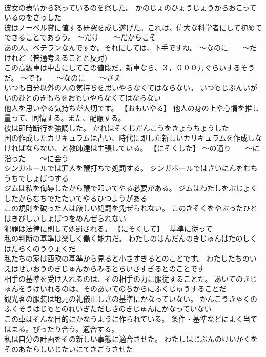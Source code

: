 \documentclass[8pt]{extreport}
\begin{document}
\begin{CJK}{UTF8}{min}
\\	彼女の表情から怒っているのを察した。	かのじょのひょうじょうからおこっているのをさっした 
\\	彼はノーベル賞に値する研究を成し遂げた。これは、偉大な科学者にして初めてできることであろう。	～だけ　　～だからこそ
\\	あの人、ベテランなんですか。それにしては、下手ですね。	～なのに　　～だけれど（普通考えることと反対）
\\	この高級車は中古にしてこの値段だ。新車なら、３，０００万ぐらいするそうだ。	～でも　　～なのに　　～さえ
\\	いつも自分以外の人の気持ちを思いやらなくてはならない。	いつもじぶんいがいのひとのきもちをおもいやらなくてはならない 
\\	他人を思いやる気持ちが大切です。	【おもいやる】 他人の身の上や心情を推し量って、同情する。また、配慮する。
\\	彼は即時断行を強調した。	かれはそくじだんこうをきょうちょうした 
\\	国の作成したカリキュラムは古い、時代に即した新しいカリキュラムを作成しなければならない、と教師達は主張している。	【にそくした】 ～の通り　　～に沿った　　～に会う
\\	シンガポールでは罪人を鞭打ちで処罰する。	シンガポールではざいにんをむちうちでしょばつする 
\\	ジムは私を侮辱したから鞭で叩いてやる必要がある。	ジムはわたしをぶじょくしたからむちでたたいてやるひつようがある 
\\	この規則を破った人は厳しい処罰を免ぜられない。	このきそくをやぶったひとはきびしいしょばつをめんぜられない 
\\	犯罪は法律に則して処罰される。	【にそくして】　 基準に従って
\\	私の判断の基準は楽しく働く能力だ。	わたしのはんだんのきじゅんはたのしくはたらくのうりょくだ 
\\	私たちの家は西欧の基準から見ると小さすぎるとのことです。	わたしたちのいえはせいおうのきじゅんからみるとちいさすぎるとのことです 
\\	相手の基準を受け入れるのは、その相手の力に服従することだ。	あいてのきじゅんをうけいれるのは、そのあいてのちからにふくじゅうすることだ 
\\	観光客の服装は地元の礼儀正しさの基準にかなっていない。	かんこうきゃくのふくそうはじもとのれいぎただしさのきじゅんにかなっていない 
\\	この車はそんな目的にかなうように作られている。	条件・基準などによく当てはまる。ぴったり合う。適合する。
\\	私は自分の計画をその新しい事態に適合させた。	わたしはじぶんのけいかくをそのあたらしいじたいにてきごうさせた 

\end{CJK}
\end{document}
